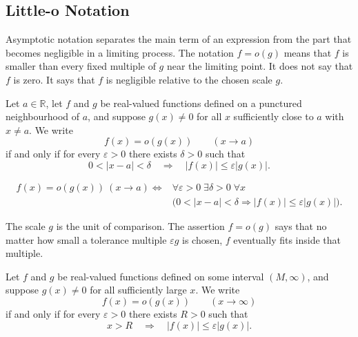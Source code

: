 
\subsection*{Little-o Notation}
\label{subsec:little-o-notation}

Asymptotic notation separates the main term of an expression from the part
that becomes negligible in a limiting process. The notation $f=o(g)$ means
that $f$ is smaller than every fixed multiple of $g$ near the limiting point.
It does not say that $f$ is zero. It says that $f$ is negligible relative to
the chosen scale $g$.

\begin{definition}
\label{def:little-o-at-a-point}
Let $a\in\mathbb{R}$, let $f$ and $g$ be real-valued functions defined on a
punctured neighbourhood of $a$, and suppose $g(x)\neq 0$ for all $x$ sufficiently
close to $a$ with $x\neq a$. We write
\[
  f(x)=o(g(x))\qquad (x\to a)
\]
if and only if for every $\varepsilon>0$ there exists $\delta>0$ such that
\[
  0<|x-a|<\delta
  \quad\Longrightarrow\quad
  |f(x)|\leq \varepsilon |g(x)|.
\]
\end{definition}

\begin{remark*}
\[
\begin{aligned}
f(x)=o(g(x))\ (x\to a)
\Longleftrightarrow
&\forall\varepsilon>0\;\exists\delta>0\;\forall x\\
&\bigl(0<|x-a|<\delta
  \Rightarrow |f(x)|\leq \varepsilon |g(x)|\bigr).
\end{aligned}
\]
\end{remark*}

\begin{remark*}[Interpretation]
The scale $g$ is the unit of comparison. The assertion $f=o(g)$ says that no
matter how small a tolerance multiple $\varepsilon g$ is chosen, $f$ eventually
fits inside that multiple.
\end{remark*}

\NoLocalDependencies

\begin{definition}
\label{def:little-o-at-infinity}
Let $f$ and $g$ be real-valued functions defined on some interval
$(M,\infty)$, and suppose $g(x)\neq 0$ for all sufficiently large $x$. We write
\[
  f(x)=o(g(x))\qquad (x\to\infty)
\]
if and only if for every $\varepsilon>0$ there exists $R>0$ such that
\[
  x>R
  \quad\Longrightarrow\quad
  |f(x)|\leq \varepsilon |g(x)|.
\]
\end{definition}


